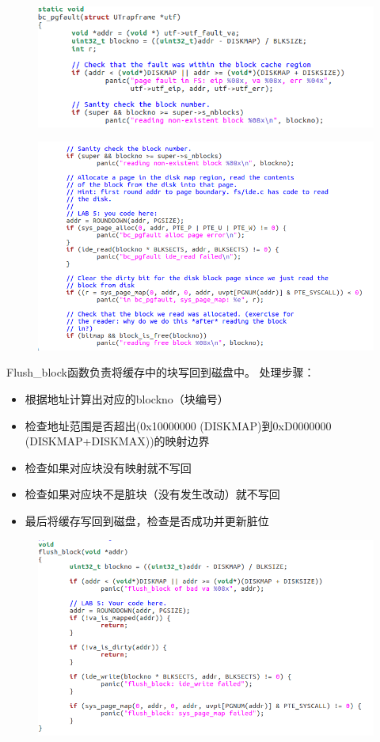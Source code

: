 \documentclass[a4paper,12pt]{report}
\begin{document}
\begin{figure}[H]
	\centering
	\includegraphics [width=1.0\textwidth]{figure//image1000.png}
\end{figure}
\begin{figure}[H]
	\centering
	\includegraphics [width=1.0\textwidth]{figure//image1001.png}
\end{figure}
Flush\_block函数负责将缓存中的块写回到磁盘中。
处理步骤：
\begin{itemize}
  \item 根据地址计算出对应的blockno（块编号）
  \item 检查地址范围是否超出(0x10000000 (DISKMAP)到0xD0000000 (DISKMAP+DISKMAX))的映射边界
  \item 检查如果对应块没有映射就不写回
  \item 检查如果对应块不是脏块（没有发生改动）就不写回
  \item  最后将缓存写回到磁盘，检查是否成功并更新脏位
\end{itemize}

\begin{figure}[H]
	\centering
	\includegraphics [width=1.0\textwidth]{figure//image1002.png}
\end{figure}
\end{document}
